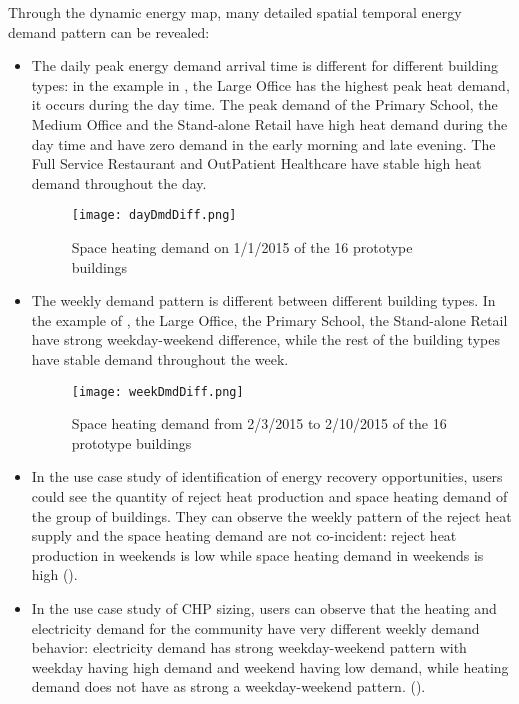 Through the dynamic energy map, many detailed spatial temporal energy
demand pattern can be revealed:
\begin{itemize}
\item The daily peak energy demand arrival time is different for
  different building types: in the example in ,
  the Large Office has the highest peak heat demand, it occurs during
  the day time. The peak demand of the Primary School, the Medium
  Office and the Stand-alone Retail have high heat demand during the
  day time and have zero demand in the early morning and late
  evening. The Full Service Restaurant and OutPatient Healthcare have
  stable high heat demand throughout the day.

  \begin{figure}[h!]
    \centering
    \texttt{[image: dayDmdDiff.png]}
    \caption{Space heating demand on 1/1/2015 of the 16 prototype
      buildings}
    \label{fig:dayDmdDiff}
  \end{figure}

\item The weekly demand pattern is different between different
  building types. In the example of , the Large
  Office, the Primary School, the Stand-alone Retail have strong
  weekday-weekend difference, while the rest of the building types
  have stable demand throughout the week.
  \begin{figure}[h!]
    \centering
    \texttt{[image: weekDmdDiff.png]}
    \caption{Space heating demand from 2/3/2015 to 2/10/2015 of the 16
      prototype buildings}
    \label{fig:weekDmdDiff}
  \end{figure}

\item In the use case study of identification of energy recovery
  opportunities, users could see the quantity of reject heat
  production and space heating demand of the group of buildings. They
  can observe the weekly pattern of the reject heat supply and the
  space heating demand are not co-incident: reject heat production in
  weekends is low while space heating demand in weekends is high
  ().

\item In the use case study of CHP sizing, users can observe that the
  heating and electricity demand for the community have very different
  weekly demand behavior: electricity demand has strong
  weekday-weekend pattern with weekday having high demand and weekend
  having low demand, while heating demand does not have as strong a
  weekday-weekend pattern. ().
\end{itemize}

